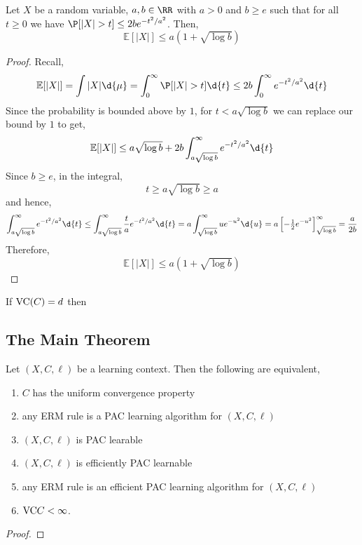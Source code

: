 \documentclass[12pt]{article}
\renewcommand{\E}{\mathbb{E}}
\begin{document}
\label{lemma_A}

\begin{lemma}
Let $X$ be a random variable, $a, b \in \RR$ with $a > 0$ and $b \ge e$ such that for all $t \ge 0$ we have $\P[|X| > t] \le 2 b e^{-t^2 / a^2}$. Then,
\[ \E[|X|] \le a (1 + \sqrt{\log{b}}) \] 
\end{lemma}

\begin{proof}
Recall,
\[ \E[|X|] = \int |X| \d{\mu} = \int_0^\infty \P[|X| > t] \d{t} \le 2 b \int_0^\infty e^{-t^2/a^2} \d{t} \]
Since the probability is bounded above by $1$, for $t < a \sqrt{\log{b}}$ we can replace our bound by $1$ to get,
\[ \E[|X|] \le a \sqrt{\log{b}} + 2 b \int_{a \sqrt{\log{b}}}^\infty e^{-t^2/a^2} \d{t} \]
Since $b \ge e$, in the integral,
\[ t \ge a \sqrt{\log{b}} \ge a \]
and hence,
\[ \int_{a \sqrt{\log{b}}}^\infty e^{-t^2/a^2} \d{t} \le \int_{a \sqrt{\log{b}}}^\infty \frac{t}{a} e^{-t^2/a^2} \d{t} = a \int_{\sqrt{\log{b}}}^\infty u e^{-u^2} \d{u} = a \left[- \tfrac{1}{2} e^{-u^2} \right]_{\sqrt{\log{b}}}^\infty = \frac{a}{2b} \]
Therefore,
\[ \E[|X|] \le a(1 + \sqrt{\log{b}}) \]
\end{proof}

\begin{cor}
If $\mathrm{VC}(C) = d$ then 
\end{cor}

\subsection{The Main Theorem}

\begin{theorem}
Let $(X, C, \ell)$ be a learning context. Then the following are equivalent,
\begin{enumerate}
\item $C$ has the uniform convergence property
\item any ERM rule is a PAC learning algorithm for $(X, C, \ell)$
\item $(X, C, \ell)$ is PAC learable
\item $(X, C, \ell)$ is efficiently PAC learnable
\item any ERM rule is an efficient PAC learning algorithm for $(X, C, \ell)$
\item $\mathrm{VC}{C} < \infty$.
\end{enumerate}
\end{theorem}

\begin{proof}

\end{proof}
\end{document}
